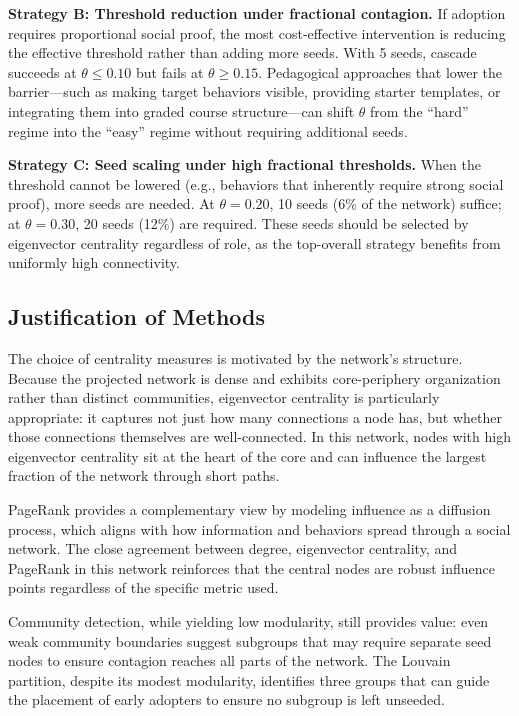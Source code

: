 \documentclass[12pt]{article}
\begin{document}
\textbf{Strategy B: Threshold reduction under fractional contagion.} If adoption requires proportional social proof, the most cost-effective intervention is reducing the effective threshold rather than adding more seeds. With 5 seeds, cascade succeeds at $\theta \leq 0.10$ but fails at $\theta \geq 0.15$. Pedagogical approaches that lower the barrier---such as making target behaviors visible, providing starter templates, or integrating them into graded course structure---can shift $\theta$ from the ``hard'' regime into the ``easy'' regime without requiring additional seeds.

\textbf{Strategy C: Seed scaling under high fractional thresholds.} When the threshold cannot be lowered (e.g., behaviors that inherently require strong social proof), more seeds are needed. At $\theta = 0.20$, 10 seeds (6\% of the network) suffice; at $\theta = 0.30$, 20 seeds (12\%) are required. These seeds should be selected by eigenvector centrality regardless of role, as the top-overall strategy benefits from uniformly high connectivity.

\subsection{Justification of Methods}

The choice of centrality measures is motivated by the network's structure. Because the projected network is dense and exhibits core-periphery organization rather than distinct communities, eigenvector centrality is particularly appropriate: it captures not just how many connections a node has, but whether those connections themselves are well-connected. In this network, nodes with high eigenvector centrality sit at the heart of the core and can influence the largest fraction of the network through short paths.

PageRank provides a complementary view by modeling influence as a diffusion process, which aligns with how information and behaviors spread through a social network. The close agreement between degree, eigenvector centrality, and PageRank in this network reinforces that the central nodes are robust influence points regardless of the specific metric used.

Community detection, while yielding low modularity, still provides value: even weak community boundaries suggest subgroups that may require separate seed nodes to ensure contagion reaches all parts of the network. The Louvain partition, despite its modest modularity, identifies three groups that can guide the placement of early adopters to ensure no subgroup is left unseeded.
\end{document}
